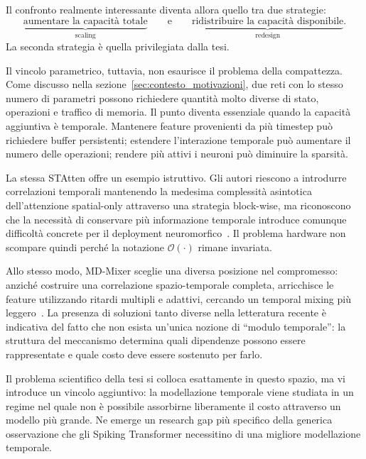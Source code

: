 Il confronto realmente interessante diventa allora quello tra due strategie:
\begin{equation}
\label{eq:scaling_vs_redesign}
\underbrace{\text{aumentare la capacità totale}}_{\text{scaling}} \qquad\text{e}\qquad \underbrace{\text{ridistribuire la capacità disponibile}}_{\text{redesign}}.
\end{equation}
La seconda strategia è quella privilegiata dalla tesi.

Il vincolo parametrico, tuttavia, non esaurisce il problema della compattezza. Come discusso nella sezione~\ref{sec:contesto_motivazioni}, due reti con lo stesso numero di parametri possono richiedere quantità molto diverse di stato, operazioni e traffico di memoria. Il punto diventa essenziale quando la capacità aggiuntiva è temporale. Mantenere feature provenienti da più timestep può richiedere buffer persistenti; estendere l'interazione temporale può aumentare il numero delle operazioni; rendere più attivi i neuroni può diminuire la sparsità.

La stessa STAtten offre un esempio istruttivo. Gli autori riescono a introdurre correlazioni temporali mantenendo la medesima complessità asintotica dell'attenzione spatial-only attraverso una strategia block-wise, ma riconoscono che la necessità di conservare più informazione temporale introduce comunque difficoltà concrete per il deployment neuromorfico~\cite{lee2025spiking}. Il problema hardware non scompare quindi perché la notazione $\mathcal{O}(\cdot)$ rimane invariata.

Allo stesso modo, MD-Mixer sceglie una diversa posizione nel compromesso: anziché costruire una correlazione spazio-temporale completa, arricchisce le feature utilizzando ritardi multipli e adattivi, cercando un temporal mixing più leggero~\cite{shi2026multidelay}. La presenza di soluzioni tanto diverse nella letteratura recente è indicativa del fatto che non esista un'unica nozione di ``modulo temporale'': la struttura del meccanismo determina quali dipendenze possono essere rappresentate e quale costo deve essere sostenuto per farlo.

Il problema scientifico della tesi si colloca esattamente in questo spazio, ma vi introduce un vincolo aggiuntivo: la modellazione temporale viene studiata in un regime nel quale non è possibile assorbirne liberamente il costo attraverso un modello più grande. Ne emerge un research gap più specifico della generica osservazione che gli Spiking Transformer necessitino di una migliore modellazione temporale.

